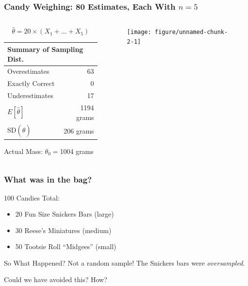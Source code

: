\begin{frame}[fragile]



\frametitle{Candy Weighing: 80 Estimates, Each With $n=5$}

\begin{columns} 
\begin{column}[c]{5cm} 
\small

$$\widehat{\theta} = 20 \times (X_1 + \hdots + X_5)$$

\small
   \begin{tabular}{lr}
   \hline \hline
   \multicolumn{2}{l}{Summary of Sampling Dist.} \\
   \hline
   Overestimates& 63\\
   Exactly Correct& 0\\
   Underestimates& 17\\
   \hline
   $E[\hat{\theta}]$& 1194 grams\\
   SD$(\widehat{\theta})$& 206 grams\\
   \hline
   \end{tabular}
   
  \vspace{1em}
  Actual Mass:  $\theta_0 =$1004 grams
\end{column} 
\begin{column}[c]{5cm} 

\begin{figure}
\centering
\begin{knitrout}
\color{fgcolor}

{\centering \texttt{[image: figure/unnamed-chunk-2-1]} 

}



\end{knitrout}


\end{figure}

\end{column} 
\end{columns} 


\end{frame}

\begin{frame}
\frametitle{What was in the bag?}

100 Candies Total:
\begin{itemize}
	\item 20 Fun Size Snickers Bars (large) 
	\item 30 Reese's Miniatures (medium) 
	\item 50 Tootsie Roll ``Midgees'' (small)
\end{itemize}
\begin{block}{So What Happened?}
	\pause Not a random sample! The Snickers bars were \emph{oversampled}.
\end{block}
\begin{block}{Could we have avoided this? How?}

\end{block}
\end{frame}


